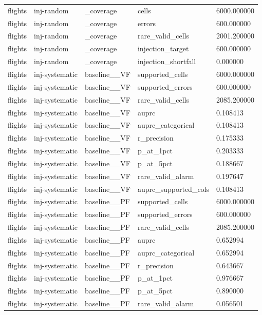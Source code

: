 \begin{tabular}{lllll}
flights & inj-random & \_coverage & cells & 6000.000000 \\
flights & inj-random & \_coverage & errors & 600.000000 \\
flights & inj-random & \_coverage & rare\_valid\_cells & 2001.200000 \\
flights & inj-random & \_coverage & injection\_target & 600.000000 \\
flights & inj-random & \_coverage & injection\_shortfall & 0.000000 \\
flights & inj-systematic & baseline\_\_VF & supported\_cells & 6000.000000 \\
flights & inj-systematic & baseline\_\_VF & supported\_errors & 600.000000 \\
flights & inj-systematic & baseline\_\_VF & rare\_valid\_cells & 2085.200000 \\
flights & inj-systematic & baseline\_\_VF & auprc & 0.108413 \\
flights & inj-systematic & baseline\_\_VF & auprc\_categorical & 0.108413 \\
flights & inj-systematic & baseline\_\_VF & r\_precision & 0.175333 \\
flights & inj-systematic & baseline\_\_VF & p\_at\_1pct & 0.203333 \\
flights & inj-systematic & baseline\_\_VF & p\_at\_5pct & 0.188667 \\
flights & inj-systematic & baseline\_\_VF & rare\_valid\_alarm & 0.197647 \\
flights & inj-systematic & baseline\_\_VF & auprc\_supported\_cols & 0.108413 \\
flights & inj-systematic & baseline\_\_PF & supported\_cells & 6000.000000 \\
flights & inj-systematic & baseline\_\_PF & supported\_errors & 600.000000 \\
flights & inj-systematic & baseline\_\_PF & rare\_valid\_cells & 2085.200000 \\
flights & inj-systematic & baseline\_\_PF & auprc & 0.652994 \\
flights & inj-systematic & baseline\_\_PF & auprc\_categorical & 0.652994 \\
flights & inj-systematic & baseline\_\_PF & r\_precision & 0.643667 \\
flights & inj-systematic & baseline\_\_PF & p\_at\_1pct & 0.976667 \\
flights & inj-systematic & baseline\_\_PF & p\_at\_5pct & 0.890000 \\
flights & inj-systematic & baseline\_\_PF & rare\_valid\_alarm & 0.056501 \\

\end{tabular}
